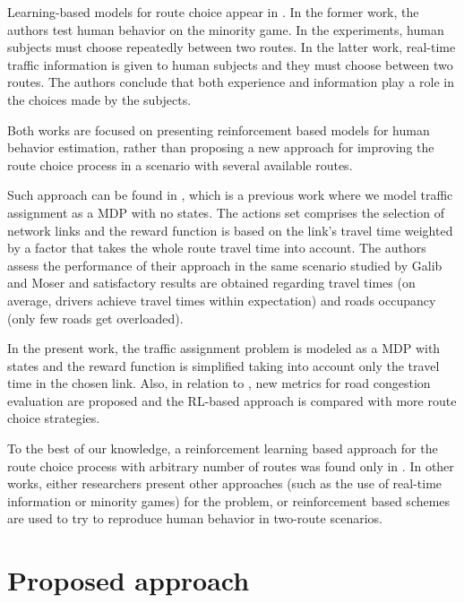 \documentclass{RITA}
\begin{document}
Learning-based models for route choice appear in \cite{Chmura&Pitz2007,Ben-Elia&Shiftan2010}. In the former work, the authors test human behavior on the minority game. In the experiments, human subjects must choose repeatedly between two routes.  In the latter work, real-time traffic information is given to human subjects and they must choose between two routes. The authors conclude that both experience and information play a role in the choices made by the subjects.

Both works are focused on presenting reinforcement based models for human behavior estimation, rather than proposing a new approach for improving the route choice process in a scenario with several available routes. 

Such approach can be found in \cite{Tavares&Bazzan2012}, which is a previous work where we model traffic assignment as a MDP with no states. The actions set comprises the selection of network links and the reward function is based on the link's travel time weighted by a factor that takes the whole route travel time into account. The authors assess the performance of their approach in the same scenario studied by Galib and Moser \cite{Galib&Moser2011} and satisfactory results are obtained regarding travel times (on average, drivers achieve travel times within expectation) and roads occupancy (only few roads get overloaded). 

In the present work, the traffic assignment problem is modeled as a MDP with states and the reward function is simplified taking into account only the travel time in the chosen link. Also, in relation to \cite{Tavares&Bazzan2012}, new metrics for road congestion evaluation are proposed and the RL-based approach is compared with more route choice strategies. %

To the best of our knowledge, a reinforcement learning based approach for the route choice process with arbitrary number of routes was found only in \cite{Tavares&Bazzan2012}. In other works, either researchers present other approaches (such as the use of real-time information or minority games) for the problem, or reinforcement based schemes are used to try to reproduce human behavior in two-route scenarios.

\section{Proposed approach}
\label{sec:proposal}
\end{document}
